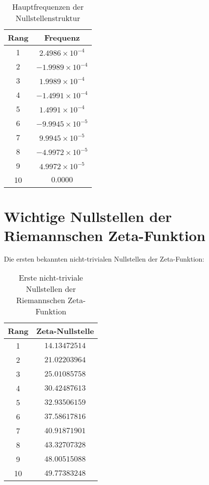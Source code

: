 \documentclass[a4paper,12pt]{article}
\begin{document}
\begin{table}[h]
    \centering
    \renewcommand{\arraystretch}{1.4}
    \begin{tabular}{c c}
        \toprule
        \textbf{Rang} & \textbf{Frequenz} \\
        \midrule
        1 & \( 2.4986 \times 10^{-4} \) \\
        2 & \( -1.9989 \times 10^{-4} \) \\
        3 & \( 1.9989 \times 10^{-4} \) \\
        4 & \( -1.4991 \times 10^{-4} \) \\
        5 & \( 1.4991 \times 10^{-4} \) \\
        6 & \( -9.9945 \times 10^{-5} \) \\
        7 & \( 9.9945 \times 10^{-5} \) \\
        8 & \( -4.9972 \times 10^{-5} \) \\
        9 & \( 4.9972 \times 10^{-5} \) \\
        10 & \( 0.0000 \) \\
        \bottomrule
    \end{tabular}
    \caption{Hauptfrequenzen der Nullstellenstruktur}
\end{table}

\section{Wichtige Nullstellen der Riemannschen Zeta-Funktion}
Die ersten bekannten nicht-trivialen Nullstellen der Zeta-Funktion:

\begin{table}[h]
    \centering
    \renewcommand{\arraystretch}{1.4}
    \begin{tabular}{c c}
        \toprule
        \textbf{Rang} & \textbf{Zeta-Nullstelle} \\
        \midrule
        1 & \( 14.13472514 \) \\
        2 & \( 21.02203964 \) \\
        3 & \( 25.01085758 \) \\
        4 & \( 30.42487613 \) \\
        5 & \( 32.93506159 \) \\
        6 & \( 37.58617816 \) \\
        7 & \( 40.91871901 \) \\
        8 & \( 43.32707328 \) \\
        9 & \( 48.00515088 \) \\
        10 & \( 49.77383248 \) \\
        \bottomrule
    \end{tabular}
    \caption{Erste nicht-triviale Nullstellen der Riemannschen Zeta-Funktion}
\end{table}
\end{document}
